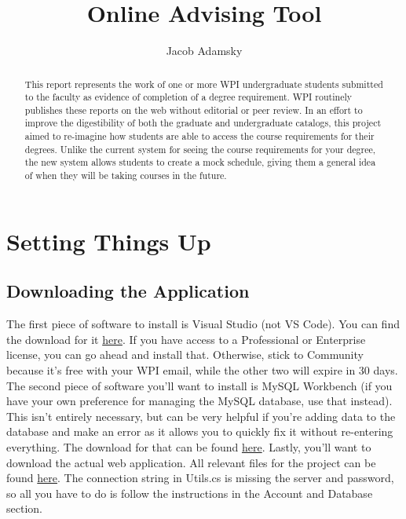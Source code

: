 \documentclass[12pt]{article}
\title{Online Advising Tool}
\author{Jacob Adamsky}
\begin{document}
	\raggedright
	\setlength\parindent{24pt}
	\vspace*{2cm}\begin{tcolorbox}[colback=lightblue, colframe=white, width=250pt, height=150pt, center]
		\maketitle
	\end{tcolorbox}
	\begin{abstract}
		\setlength{\cftsubsubsecindent}{12cm} This report represents the work of one or more WPI undergraduate students submitted to the faculty as evidence of completion of a degree requirement. WPI routinely publishes these reports on the web without editorial or peer review. In an effort to improve the digestibility of both the graduate and undergraduate catalogs, this project aimed to re-imagine how students are able to access the course requirements for their degrees. Unlike the current system for seeing the course requirements for your degree, the new system allows students to create a mock schedule, giving them a general idea of when they will be taking courses in the future.
	\end{abstract}
	
	\pagebreak
	\tableofcontents
	\pagebreak
	
	\section{Setting Things Up}
		\subsection{Downloading the Application}
			The first piece of software to install is Visual Studio (not VS Code). You can find the download for it \href{https://visualstudio.microsoft.com/downloads/}{here}. If you have access to a Professional or Enterprise license, you can go ahead and install that. Otherwise, stick to Community because it's free with your WPI email, while the other two will expire in 30 days. The second piece of software you'll want to install is MySQL Workbench (if you have your own preference for managing the MySQL database, use that instead). This isn't entirely necessary, but can be very helpful if you're adding data to the database and make an error as it allows you to quickly fix it without re-entering everything. The download for that can be found \href{https://www.mysql.com/products/workbench/}{here}.
			Lastly, you'll want to download the actual web application. All relevant files for the project can be found 
			\href{https://github.com/adamskyjacob/Advising-Tool}{here}. The connection string in Utils.cs is missing the server and password, so all you have to do is follow the instructions in the Account and Database section.
			
\end{document}

